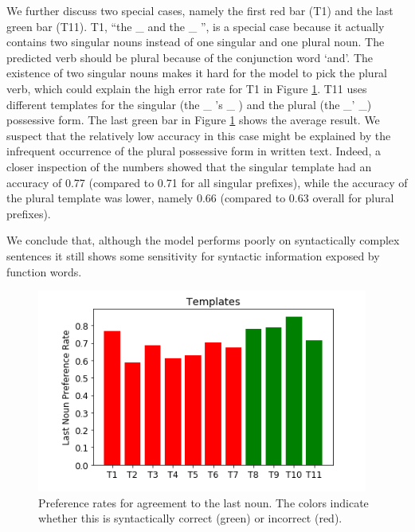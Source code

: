 %
We further discuss two special cases,
namely the first red bar (T1) and 
the last green bar (T11).
T1, ``the \_ and the \_ '', is a special case because it 
actually contains two singular nouns
instead of one singular and one plural noun. 
The predicted verb should be plural because of the
conjunction word `and'.
The existence of two singular nouns 
makes it hard for the model
to pick the plural verb,
which could explain the high error rate
for T1 in Figure \ref{fig:last_noun_rates}.
%
T11 uses different templates for the singular 
(the \_ 's \_ ) and the plural (the \_' \_) possessive form.
The last green bar in Figure \ref{fig:last_noun_rates} shows the average result.
We suspect that the relatively low accuracy
in this case might be explained by the infrequent
occurrence of the plural possessive form in written text.
Indeed, a closer inspection of the numbers showed that
the singular template had an accuracy
of 0.77 (compared to 0.71 for all singular prefixes), 
while the accuracy of the plural template
was lower, namely 0.66 (compared to 0.63 overall for plural prefixes).
%

We conclude that, although the model 
performs poorly on syntactically complex sentences it
still shows some sensitivity for syntactic 
information exposed by function words. 


\begin{figure}
    \centering
\includegraphics[scale=0.5]{screenshot-syntactic-templates} 
\caption{Preference rates for agreement to the last noun.
The colors indicate whether this is syntactically correct (green)
or incorrect (red).
}
\label{fig:last_noun_rates}
\end{figure}



